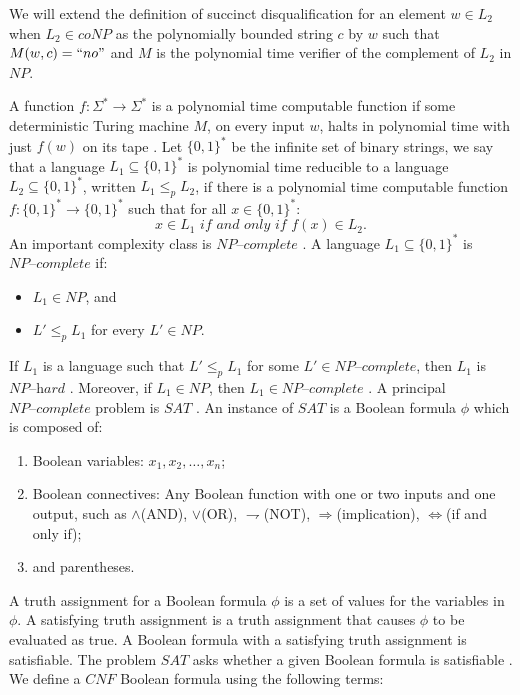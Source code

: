 \documentclass[a4paper,UKenglish,cleveref, autoref]{lipics-v2019}
\begin{document}
\begin{definition}
We will extend the definition of succinct disqualification for an element $w \in L_{2}$ when $L_{2} \in coNP$ as the polynomially bounded string $c$ by $w$ such that $M(w, c) = ``no"$ and $M$ is the polynomial time verifier of the complement of $L_{2}$ in $NP$.
\end{definition}

A function $f : \Sigma^{*} \rightarrow \Sigma^{*}$ is a polynomial time computable function if some deterministic Turing machine $M$, on every input $w$, halts in polynomial time with just $f(w)$ on its tape \cite{MS06}. Let $\{0, 1\}^{*}$ be the infinite set of binary strings, we say that a language $L_{1} \subseteq \{0, 1\}^{*}$ is polynomial time reducible to a language $L_{2} \subseteq \{0, 1\}^{*}$, written $L_{1} \leq_{p} L_{2}$, if there is a polynomial time computable function $f : \{0, 1\}^{*} \rightarrow \{0, 1\}^{*}$ such that for all $x \in \{0, 1\}^{*}$:
\[x \in L_{1} \textit{ if and only if } f(x) \in L_{2}.\]
An important complexity class is $\textit{NP--complete}$ \cite{GJ79}. A language $L_{1} \subseteq \{0, 1\}^{*}$ is $\textit{NP--complete}$ if:

\begin{itemize}
\item $L_{1} \in NP$, and
\item $L' \leq_{p} L_{1}$ for every $L' \in NP$.
\end{itemize}

If $L_{1}$ is a language such that $L' \leq_{p} L_{1}$ for some $L' \in \textit{NP--complete}$, then $L_{1}$ is $\textit{NP--hard}$ \cite{CLRS01}. Moreover, if $L_{1} \in NP$, then $L_{1} \in \textit{NP--complete}$ \cite{CLRS01}. A principal $\textit{NP--complete}$ problem is $SAT$ \cite{GJ79}. An instance of $SAT$ is a Boolean formula $\phi$ which is composed of:

\begin{enumerate}
\item Boolean variables: $x_{1}, x_{2},\ldots, x_{n}$;
\item Boolean connectives: Any Boolean function with one or two inputs and one output, such as $\wedge$(AND), $\vee$(OR), $\rightharpoondown$(NOT), $\Rightarrow$(implication), $\Leftrightarrow$(if and only if);
\item and parentheses.
\end{enumerate}

A truth assignment for a Boolean formula $\phi$ is a set of values for the variables in $\phi$. A satisfying truth assignment is a truth assignment that causes $\phi$ to be evaluated as true. A Boolean formula with a satisfying truth assignment is satisfiable. The problem $SAT$ asks whether a given Boolean formula is satisfiable \cite{GJ79}. We define a $CNF$ Boolean formula using the following terms:
\end{document}
